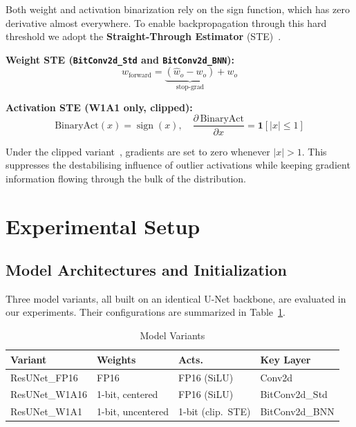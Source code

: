 \documentclass[conference]{IEEEtran}
\begin{document}
Both weight and activation binarization rely on the sign function, which has zero
derivative almost everywhere. To enable backpropagation through this hard threshold we
adopt the \textbf{Straight-Through Estimator}
(STE)~\cite{bengio2013ste}.

\textbf{Weight STE (\texttt{BitConv2d\_Std} and \texttt{BitConv2d\_BNN}):}
\begin{equation}
  w_\text{forward} = \underbrace{(\hat{w}_o - w_o)}_{\text{stop-grad}} + w_o
  \label{eq:ste-w}
\end{equation}

\textbf{Activation STE (W1A1 only, clipped):}
\begin{equation}
  \text{BinaryAct}(x) = \operatorname{sign}(x),
  \quad
  \frac{\partial\,\text{BinaryAct}}{\partial x} = \mathbf{1}[|x|\le 1]
  \label{eq:ste-a}
\end{equation}

Under the clipped variant~\cite{courbariaux2016clippedste}, gradients are set to zero
whenever $|x|>1$. This suppresses the destabilising influence of outlier activations
while keeping gradient information flowing through the bulk of the distribution.

\section{Experimental Setup}

\subsection{Model Architectures and Initialization}

Three model variants, all built on an identical U-Net backbone, are evaluated in our
experiments. Their configurations are summarized in Table~\ref{tab:variants}.

\begin{table}[h]
\centering
\caption{Model Variants}
\label{tab:variants}
\footnotesize
\begin{tabular}{@{}llll@{}}
\toprule
\textbf{Variant} & \textbf{Weights} & \textbf{Acts.} & \textbf{Key Layer} \\
\midrule
ResUNet\_FP16  & FP16              & FP16 (SiLU)        & Conv2d \\
ResUNet\_W1A16 & 1-bit, centered   & FP16 (SiLU)        & BitConv2d\_Std \\
ResUNet\_W1A1  & 1-bit, uncentered & 1-bit (clip.\ STE) & BitConv2d\_BNN \\
\bottomrule
\end{tabular}
\end{table}
\end{document}
